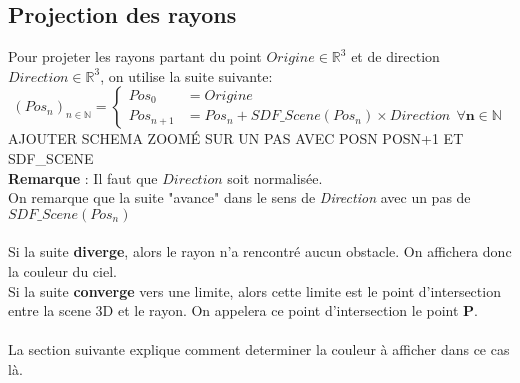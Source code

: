 \subsection{Projection des rayons}
\label{subsec:projection}
Pour projeter les rayons partant du point $Origine\in \mathbb{R}^3$ et de direction $Direction\in \mathbb{R}^3$, on utilise la suite suivante:
$$
(Pos_n)_{n\in \mathbb{N}}=\left\{
    \begin{array}{ll}
        Pos_0 &= Origine \\
        Pos_{n+1} &= Pos_n + SDF\_Scene(Pos_n)\times Direction \ \ \mathbf{\forall n\in \mathbb{N}}
    \end{array}
\right.
$$
AJOUTER SCHEMA ZOOMÉ SUR UN PAS AVEC POSN POSN+1 ET SDF\_SCENE\\
\textbf{Remarque} : Il faut que $Direction$ soit normalisée. \\
On remarque que la suite "avance" dans le sens de \emph{Direction} avec un pas de $SDF\_Scene(Pos_n)$\\
\\
Si la suite \textbf{diverge}, alors le rayon n'a rencontré aucun obstacle. On affichera donc la couleur du ciel.\\
Si la suite \textbf{converge} vers une limite, alors cette limite est le point d'intersection entre la scene 3D et le rayon. On appelera ce point d'intersection le point \textbf{P}.\\
\\
La section suivante explique comment determiner la couleur à afficher dans ce cas là.